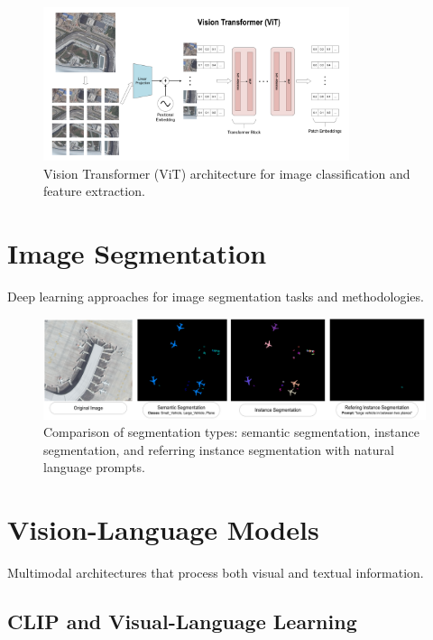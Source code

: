 \begin{figure}[htbp]
\centering
\includegraphics[width=0.8\textwidth]{Images/vit.png}
\caption{Vision Transformer (ViT) architecture for image classification and feature extraction.}
\label{fig:vit}
\end{figure}

\section{Image Segmentation}

Deep learning approaches for image segmentation tasks and methodologies.

\begin{figure}[htbp]
\centering
\includegraphics[width=1.0\textwidth]{Images/segmentation.png}
\caption{Comparison of segmentation types: semantic segmentation, instance segmentation, and referring instance segmentation with natural language prompts.}
\label{fig:segmentation}
\end{figure}

\section{Vision-Language Models}

Multimodal architectures that process both visual and textual information.

\subsection{CLIP and Visual-Language Learning}

